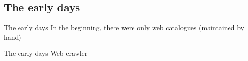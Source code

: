 \subsection{The early days}
\begin{frame}{The early days}
    In the beginning, there were only web catalogues (maintained by hand)
\end{frame}

\begin{frame}{The early days}
    Web crawler
\end{frame}
